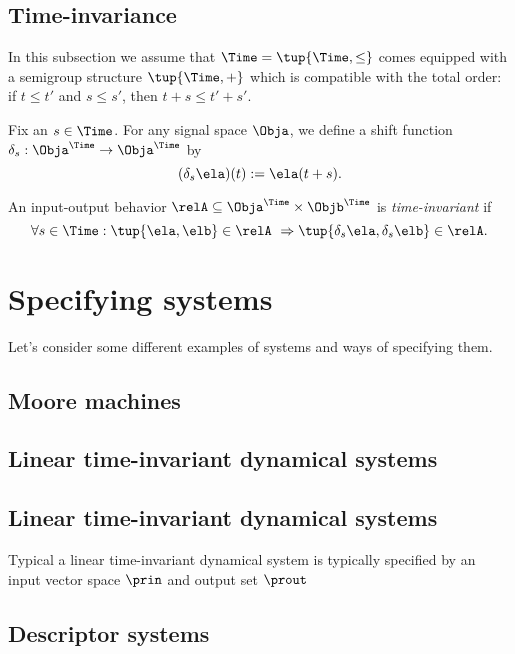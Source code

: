 
\subsection{Time-invariance}

In this subsection we assume that $\Time = \tup{\Time, \leq}$ comes equipped with a semigroup structure $\tup{\Time, +}$ which is compatible with the total order: if $t \leq t'$ and $s \leq s'$, then $t + s \leq t' + s'$.

Fix an $s \in \Time$.
For any signal space $\Obja$, we define a shift function $\delta_s: \Obja^\Time \to \Obja^\Time$ by
\begin{equation}
    (\delta_s \ela)(t) := \ela(t + s).
\end{equation}

\begin{definition}
    An input-output behavior $\relA \subseteq \Obja^\Time \times \Objb^\Time$ is \emph{time-invariant} if
    \begin{equation}
        \forall s \in \Time: \tup{\ela, \elb} \in \relA  \ \Rightarrow \tup{\delta_s \ela, \delta_s \elb} \in \relA.
    \end{equation}
\end{definition}



\section{Specifying systems}

Let's consider some different examples of systems and ways of specifying them.

\subsection{Moore machines}



\subsection{Linear time-invariant dynamical systems}


\subsection{Linear time-invariant dynamical systems}


Typical a linear time-invariant dynamical system is typically specified by an input vector space $\prin$ and output set $\prout$


\subsection{Descriptor systems}

